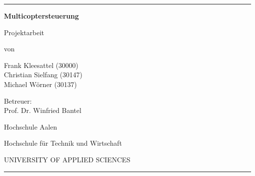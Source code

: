 \begin{titlepage}
	\rule{1\textwidth}{2pt}
	\vspace*{1.5cm}
	\begin{center}
	\LARGE{
		\textbf{}
		}

	\vspace*{1.5cm}
	
	\LARGE{\textbf{Multicoptersteuerung}}
	\vspace*{1.5cm}
	
	Projektarbeit
	
	\vspace*{1.5cm}
	
	von
	\vspace*{1.5cm}
	
	Frank Kleesattel (30000)\\
	Christian Sielfang (30147)\\
	Michael Wörner (30137)

	\vspace*{1.5cm}

	Betreuer:\\
	Prof. Dr. Winfried Bantel
	
	\vspace*{2.5cm}
	
	Hochschule Aalen
	
	Hochschule für Technik und Wirtschaft
	
	UNIVERSITY OF APPLIED SCIENCES
	
	\vspace*{1.0cm}
	\normalsize
	
	\end{center}
	\vfill
	\rule{1\textwidth}{2pt}
	
\end{titlepage}
